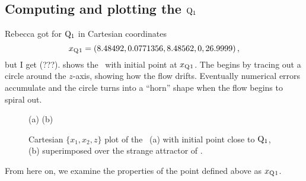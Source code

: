 \subsection{Computing and plotting the {\reqv} $\mathrm{Q}_{1}$}


Rebecca got for
$\mathrm{Q}_{1}$ in Cartesian coordinates
\[x_{\mathrm{Q}_{}1} = (8.48492,0.0771356,8.48562,0,26.9999)
\,,
\]
but I get (???).
 shows the \cLf\ with initial point at
$x_{\mathrm{Q}_{}1}$. The {\reqv} begins by tracing out a circle
around the $z$-axis, showing how the flow drifts. Eventually
numerical errors accumulate and the circle turns into a
``horn'' shape when the flow begins to spiral out.
\begin{figure}[h]
\begin{center}
(a) %
(b) %
\end{center}
\caption{
Cartesian $\{x_1,x_2,z\}$ plot of the \cLf\ (a) with initial point
close to $\mathrm{Q}_{1}$, (b) superimposed over the strange attractor of
.
    }
\label{fig:CLERelEqui}
\end{figure}

From
here on, we examine the properties of the point defined
above as $x_{\mathrm{Q}_{}1}$.

